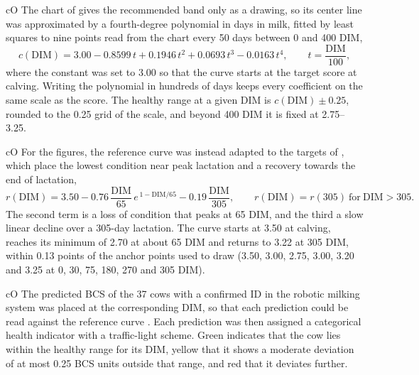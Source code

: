 \begin{marca}{cO}
The chart of \citet{french2020} gives the recommended band only as a drawing, so its center line was approximated by a fourth-degree polynomial in days in milk, fitted by least squares to nine points read from the chart every 50 days between 0 and 400 DIM,
\begin{equation}
  c(\mathrm{DIM}) = 3.00 - 0.8599\,t + 0.1946\,t^{2} + 0.0693\,t^{3} - 0.0163\,t^{4},
  \qquad t = \frac{\mathrm{DIM}}{100} ,
  \label{eq:french}
\end{equation}
where the constant was set to 3.00 so that the curve starts at the target score at calving.
Writing the polynomial in hundreds of days keeps every coefficient on the same scale as the score.
The healthy range at a given DIM is $c(\mathrm{DIM}) \pm 0.25$, rounded to the 0.25 grid of the scale, and beyond 400 DIM it is fixed at 2.75--3.25.
\end{marca}

\begin{marca}{cO}
For the figures, the reference curve was instead adapted to the targets of \citet{roche2009}, which place the lowest condition near peak lactation and a recovery towards the end of lactation,
\begin{equation}
  r(\mathrm{DIM}) = 3.50 - 0.76\,\frac{\mathrm{DIM}}{65}\, e^{\,1-\mathrm{DIM}/65} - 0.19\,\frac{\mathrm{DIM}}{305} ,
  \qquad r(\mathrm{DIM}) = r(305) \ \text{for}\ \mathrm{DIM} > 305 .
  \label{eq:roche}
\end{equation}
The second term is a loss of condition that peaks at 65 DIM, and the third a slow linear decline over a 305-day lactation.
The curve starts at 3.50 at calving, reaches its minimum of 2.70 at about 65 DIM and returns to 3.22 at 305 DIM, within 0.13 points of the anchor points used to draw  (3.50, 3.00, 2.75, 3.00, 3.20 and 3.25 at 0, 30, 75, 180, 270 and 305 DIM).
\end{marca}

\begin{marca}{cO}
The predicted BCS of the 37 cows with a confirmed ID in the robotic milking system was placed at the corresponding DIM, so that each prediction could be read against the reference curve .
Each prediction was then assigned a categorical health indicator with a traffic-light scheme.
Green indicates that the cow lies within the healthy range for its DIM, yellow that it shows a moderate deviation of at most 0.25 BCS units outside that range, and red that it deviates further.
\end{marca}

